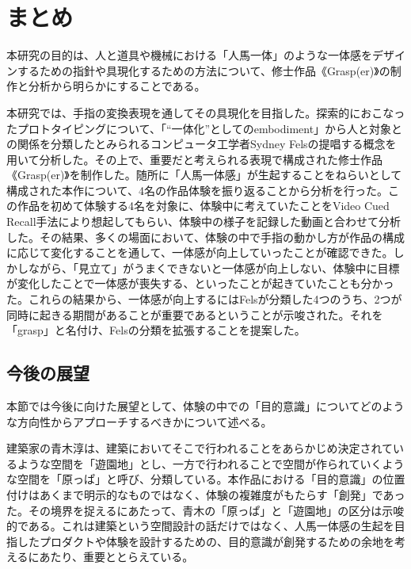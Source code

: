 \chapter{まとめ}
\label{matome}
本研究の目的は、人と道具や機械における「人馬一体」のような一体感をデザインするための指針や具現化するための方法について、修士作品《Grasp(er)》の制作と分析から明らかにすることである。

本研究では、手指の変換表現を通してその具現化を目指した。探索的におこなったプロトタイピングについて、「``一体化''としてのembodiment」から人と対象との関係を分類したとみられるコンピュータ工学者Sydney Felsの提唱する概念を用いて分析した。その上で、重要だと考えられる表現で構成された修士作品《Grasp(er)》を制作した。随所に「人馬一体感」が生起することをねらいとして構成された本作について、4名の作品体験を振り返ることから分析を行った。この作品を初めて体験する4名を対象に、体験中に考えていたことをVideo Cued Recall手法により想起してもらい、体験中の様子を記録した動画と合わせて分析した。その結果、多くの場面において、体験の中で手指の動かし方が作品の構成に応じて変化することを通して、一体感が向上していったことが確認できた。しかしながら、「見立て」がうまくできないと一体感が向上しない、体験中に目標が変化したことで一体感が喪失する、といったことが起きていたことも分かった。これらの結果から、一体感が向上するにはFelsが分類した4つのうち、2つが同時に起きる期間があることが重要であるということが示唆された。それを「grasp」と名付け、Felsの分類を拡張することを提案した。

\section{今後の展望}

本節では今後に向けた展望として、体験の中での「目的意識」についてどのような方向性からアプローチするべきかについて述べる。

建築家の青木淳\cite{aoki2004harappa}は、建築においてそこで行われることをあらかじめ決定されているような空間を「遊園地」とし、一方で行われることで空間が作られていくような空間を「原っぱ」と呼び、分類している。本作品における「目的意識」の位置付けはあくまで明示的なものではなく、体験の複雑度がもたらす「創発」であった。その境界を捉えるにあたって、青木の「原っぱ」と「遊園地」の区分は示唆的である。これは建築という空間設計の話だけではなく、人馬一体感の生起を目指したプロダクトや体験を設計するための、目的意識が創発するための余地を考えるにあたり、重要ととらえている。

